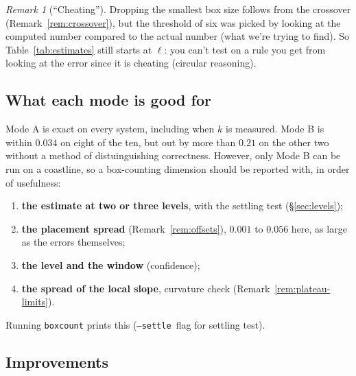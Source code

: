 \documentclass[11pt, a4paper]{article}
\theoremstyle{plain}
\theoremstyle{definition}
\theoremstyle{remark}
\newtheorem{remark}[theorem]{Remark}
\begin{document}
\begin{remark}[``Cheating'']
\label{rem:nocheat}
    Dropping the smallest box size follows from the crossover (Remark~\ref{rem:crossover}), but the threshold of six was picked by looking at the computed number compared to the actual number (what we're trying to find).
    So Table~\ref{tab:estimates} still starts at $\ell$: you can't test on a rule you get from looking at the error since it is cheating (circular reasoning).
\end{remark}


\subsection{What each mode is good for}

Mode A is exact on every system, including when $k$ is measured. 
Mode B is within $0.034$ on eight of the ten, but out by more than $0.21$ on the other two without a method of distuinguishing correctness.
However, only Mode B can be run on a coastline, so a box-counting dimension should be reported with, in order of usefulness:

\begin{enumerate}
    \item \textbf{the estimate at two or three levels}, with the settling test (\S\ref{sec:levels});
    \item \textbf{the placement spread} (Remark~\ref{rem:offsets}), $0.001$ to $0.056$ here, as large as the errors themselves;
    \item \textbf{the level and the window} (confidence);
    \item \textbf{the spread of the local slope}, curvature check (Remark~\ref{rem:plateau-limits}).
\end{enumerate}

\noindent Running \texttt{boxcount} prints this (\texttt{--settle }flag for settling test).

\subsection{Improvements}
\label{sec:improvements}
\end{document}
